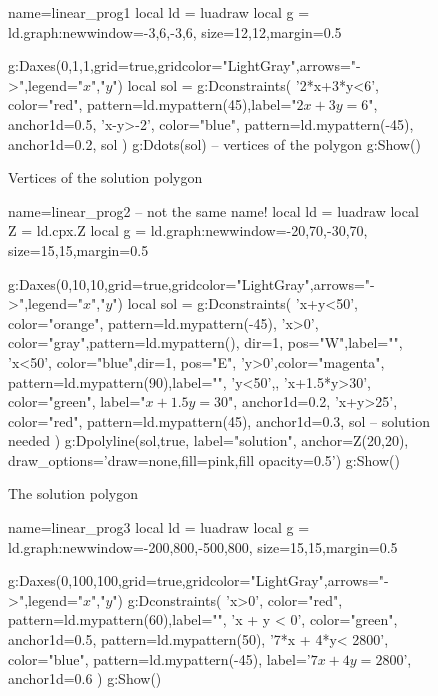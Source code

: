 \documentclass[12pt,a4paper]{article}
\begin{document}
\begin{figure}[H]
  \centering
 \begin{luadraw}{name=linear_prog1}
local ld = luadraw
local g = ld.graph:new{window={-3,6,-3,6}, size={12,12},margin=0.5}

g:Daxes({0,1,1},{grid=true,gridcolor="LightGray",arrows="->",legend={"$x$","$y$"}})
local sol = {}
g:Dconstraints(
    '2*x+3*y<6', {color="red", pattern=ld.mypattern(45),label="$2x+3y=6$", anchor1d=0.5},
    'x-y>-2', {color="blue", pattern=ld.mypattern(-45), anchor1d=0.2},
    sol
    )
g:Ddots(sol) -- vertices of the polygon
g:Show()
\end{luadraw}
  \caption{Vertices of the solution polygon}
\end{figure}

\begin{figure}[H]
  \centering
 \begin{luadraw}{name=linear_prog2} -- not the same name!
local ld = luadraw
local Z = ld.cpx.Z
local g = ld.graph:new{window={-20,70,-30,70}, size={15,15},margin=0.5}

g:Daxes({0,10,10},{grid=true,gridcolor="LightGray",arrows="->",legend={"$x$","$y$"}})
local sol = {}
g:Dconstraints(
    'x+y<50', {color="orange", pattern=ld.mypattern(-45)},
    'x>0', {color="gray",pattern=ld.mypattern(), dir=1, pos="W",label="{}"},
    'x<50', {color="blue",dir=1, pos="E"},
    'y>0',{color="magenta", pattern=ld.mypattern(90),label="{}"},
    'y<50',{},
    'x+1.5*y>30', {color="green", label="$x+1.5y=30$", anchor1d=0.2},
    'x+y>25', {color="red", pattern=ld.mypattern(45), anchor1d=0.3},
    sol -- solution needed
    )
g:Dpolyline(sol,true, 
    {label="solution", anchor=Z(20,20), draw_options='draw=none,fill=pink,fill opacity=0.5'})
g:Show()
\end{luadraw}
  \caption{The solution polygon}
\end{figure}


\begin{figure}[H]
  \centering
 \begin{luadraw}{name=linear_prog3}
local ld = luadraw
local g = ld.graph:new{window={-200,800,-500,800}, size={15,15},margin=0.5}

g:Daxes({0,100,100},{grid=true,gridcolor="LightGray",arrows="->",legend={"$x$","$y$"}})
g:Dconstraints(
    'x>0', {color="red", pattern=ld.mypattern(60),label=""},
    'x + y  < 0', {color="green", anchor1d=0.5, pattern=ld.mypattern(50)},    
    '7*x + 4*y< 2800', {color="blue", pattern=ld.mypattern(-45), label='$7x+4y=2800$', anchor1d=0.6}
    )
g:Show()
\end{luadraw}
  \caption{}
\end{figure}
\end{document}
